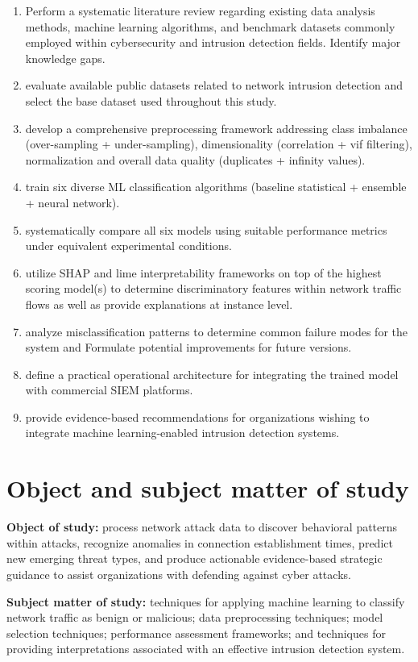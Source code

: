 \begin{enumerate}
\item Perform a systematic literature review regarding existing data analysis methods, machine learning algorithms, and benchmark datasets commonly employed within cybersecurity and intrusion detection fields. Identify major knowledge gaps.
\item evaluate available public datasets related to network intrusion detection and select the base dataset used throughout this study.
\item develop a comprehensive preprocessing framework addressing class imbalance (over-sampling + under-sampling), dimensionality (correlation + vif filtering), normalization and overall data quality (duplicates + infinity values).
\item train six diverse ML classification algorithms (baseline statistical + ensemble + neural network).
\item systematically compare all six models using suitable performance metrics under equivalent experimental conditions.
\item utilize SHAP and lime interpretability frameworks on top of the highest scoring model(s) to determine discriminatory features within network traffic flows as well as provide explanations at instance level.
\item analyze misclassification patterns to determine common failure modes for the system and Formulate potential improvements for future versions.
\item define a practical operational architecture for integrating the trained model with commercial SIEM platforms.
\item provide evidence-based recommendations for organizations wishing to integrate machine learning-enabled intrusion detection systems.
\end{enumerate}

\section{Object and subject matter of study}

{\bf Object of study:} process network attack data to discover behavioral patterns within attacks, recognize anomalies in connection establishment times, predict new emerging threat types, and produce actionable evidence-based strategic guidance to assist organizations with defending against cyber attacks.

{\bf Subject matter of study:} techniques for applying machine learning to classify network traffic as benign or malicious; data preprocessing techniques; model selection techniques; performance assessment frameworks; and techniques for providing interpretations associated with an effective intrusion detection system.

